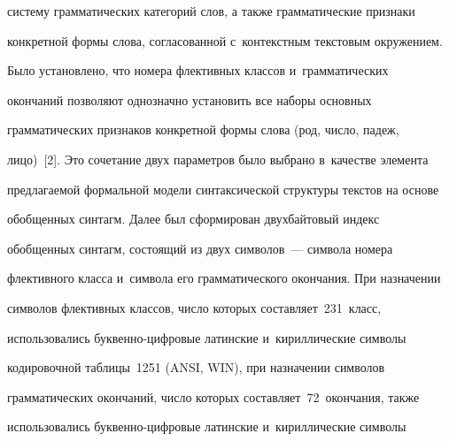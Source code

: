 систему грамматических категорий слов, а также грамматические признаки 

конкретной формы слова, согласованной с~контекстным текстовым окружением. 

Было установлено, что номера флективных классов и~грамматических 

окончаний позволяют однозначно установить все наборы основных 

грамматических признаков конкретной формы слова (род, число, падеж, 

лицо)~[2]. Это сочетание двух параметров было выбрано в~качестве элемента 

предлагаемой формальной модели синтаксической структуры текстов на основе 

обобщенных синтагм. Далее был сформирован двухбайтовый индекс 

обобщенных синтагм, состоящий из двух символов~--- символа номера 

флективного класса и~символа его грамматического окончания. При назначении 

символов флективных классов, число которых составляет~231~класс, 

использовались бук\-вен\-но-циф\-ро\-вые латинские и~кириллические  символы 

кодировочной таблицы~1251 (ANSI, WIN), при назначении символов 

грамматических окончаний, число которых составляет~72~окончания, также 

использовались бук\-вен\-но-циф\-ро\-вые латинские и~кириллические  символы\linebreak\vspace*{-12pt}



\pagebreak



\



\vspace*{-12pt}



\renewcommand{\figurename}{\protect\bf Таблица}



  


